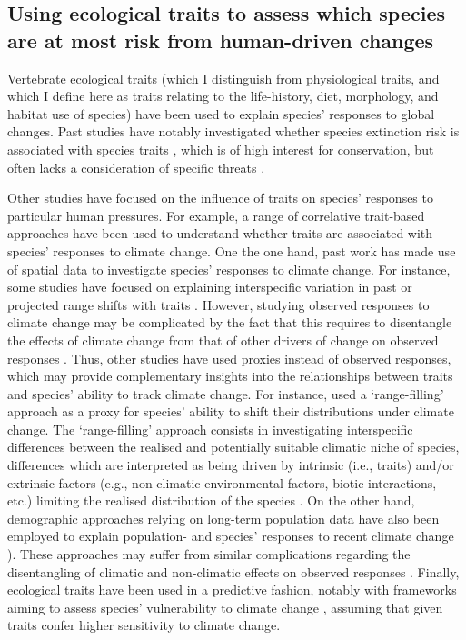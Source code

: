 \subsection{Using ecological traits to assess which species are at most risk from human-driven changes}

Vertebrate ecological traits (which I distinguish from physiological traits, and which I define here as traits relating to the life-history, diet, morphology, and habitat use of species) have been used to explain species' responses to global changes. Past studies have notably investigated whether species extinction risk is associated with species traits \citep{Lebreton2011, Ripple2017, Chichorro2019}, which is of high interest for conservation, but often lacks a consideration of specific threats \citep{GonzalezSuarez2013}. 

Other studies have focused on the influence of traits on species' responses to particular human pressures. For example, a range of correlative trait-based approaches have been used to understand whether traits are associated with species' responses to climate change. 
One the one hand, past work has made use of spatial data to investigate species' responses to climate change. For instance, some studies have focused on explaining interspecific variation in past or projected range shifts with traits \citep{Schloss2012, Mccain2014, Pacifici2017, DiMarco2021}. 
However, studying observed responses to climate change may be complicated by the fact that this requires to disentangle the effects of climate change from that of other drivers of change on observed responses \citep{MacLean2017}. Thus, other studies have used proxies instead of observed responses, which may provide complementary insights into the relationships between traits and species' ability to track climate change. For instance, \citet{Estrada2018} used a `range-filling' approach as a proxy for species' ability to shift their distributions under climate change. The `range-filling' approach consists in investigating interspecific differences between the realised and potentially suitable climatic niche of species, differences which are interpreted as being driven by intrinsic (i.e., traits) and/or extrinsic factors (e.g., non-climatic environmental factors, biotic interactions, etc.) limiting the realised distribution of the species \citep{Estrada2018, Svenning2004}.
On the other hand, demographic approaches relying on long-term population data have also been employed to explain population- and species' responses to recent climate change \citep{Spooner2018}). These approaches may suffer from similar complications regarding the disentangling of climatic and non-climatic effects on observed responses \citep{Williams2022}. 
Finally, ecological traits have been used in a predictive fashion, notably with frameworks aiming to assess species' vulnerability to climate change \citep{Foden2013, Pacifici2015}, assuming that given traits confer higher sensitivity to climate change. 

